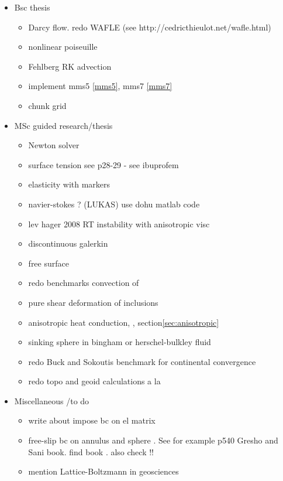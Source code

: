 
\begin{itemize}
\item Bsc thesis
\begin{itemize} 
\item Darcy flow. redo WAFLE (see http://cedricthieulot.net/wafle.html)
\item nonlinear poiseuille
\item Fehlberg RK advection
\item implement mms5 \ref{mms5}, mms7 \ref{mms7}
\item chunk grid
\end{itemize}
\item MSc guided research/thesis
\begin{itemize} 
\item Newton solver
\item surface tension see \cite{reddybook2}p28-29 - see ibuprofem 
\item elasticity with markers
\item navier-stokes ? (LUKAS) use dohu matlab code
\item lev hager 2008 RT instability with anisotropic visc
\item discontinuous galerkin
\item free surface \cite{dumy16} 
\item redo benchmarks convection of \cite{trab90}
\item pure shear deformation of inclusions \cite{trla00}
\item anisotropic heat conduction\cite[p121]{reddybook2}, \cite[p143]{reddybook2}, section\ref{sec:anisotropic}
\item sinking sphere in bingham or herschel-bulkley fluid \cite{bemj04} 
\item redo Buck and Sokoutis benchmark for continental convergence \cite{buso94}
\item redo topo and geoid calculations a la \cite{king09}
\end{itemize}
\item Miscellaneous /to do
\begin{itemize} 
\item write about impose bc on el matrix
\item free-slip bc on annulus and sphere . See for example p540 Gresho and Sani book. find book \cite{deab72}.
also check \cite{ensa82} !!
\item mention Lattice-Boltzmann in geosciences \cite{hupc08}

\end{itemize}
\end{itemize}
